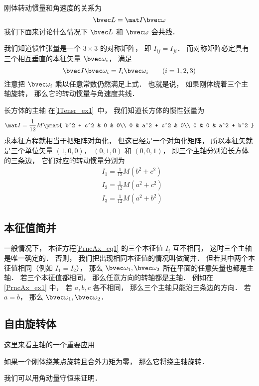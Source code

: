 
\begin{issues}
\issueDraft
\end{issues}


刚体转动惯量和角速度的关系为
\begin{equation}
\bvec L = \mat I \bvec \omega
\end{equation}
我们下面来讨论什么情况下 $\bvec L$ 和 $\bvec \omega$ 会共线．

我们知道惯性张量是一个 $3\times 3$ 的对称矩阵， 即 $I_{ij} = I_{ji}$． 而对称矩阵必定具有三个相互垂直的本征矢量 $\bvec \omega_i$， 满足
\begin{equation}\label{PrncAx_eq1}
\bvec I \bvec \omega_i = I_i \bvec \omega_i \qquad (i = 1,2,3)
\end{equation}
注意把 $\bvec \omega_i$ 乘以任意常数仍然满足上式． 也就是说， 如果刚体绕着三个主轴旋转， 那么它的转动惯量与角速度共线．

\begin{example}{长方体的主轴}\label{PrncAx_ex1}
在\autoref{ITensr_ex1}~中， 我们知道长方体的惯性张量为
\begin{equation}
\mat I = \frac{1}{12} M
\pmat{
   b^2 + c^2 & 0 & 0\\
   0 & a^2 + c^2 & 0\\
   0 & 0 & a^2 + b^2
}
\end{equation}
求本征方程就相当于把矩阵对角化， 但这已经是一个对角化矩阵， 所以本征矢就是三个单位矢量 $(1,0,0)$， $(0,1,0)$ 和 $(0,0,1)$， 即三个主轴分别沿长方体的三条边， 它们对应的转动惯量分别为
\begin{equation}
\begin{aligned}
&I_1 = \frac{1}{12}M(b^2+c^2)\\
&I_2 = \frac{1}{12}M(a^2+c^2)\\
&I_3 = \frac{1}{12}M(a^2+b^2)
\end{aligned}
\end{equation}
\end{example}

\subsection{本征值简并}
一般情况下， 本征方程\autoref{PrncAx_eq1} 的三个本征值 $I_i$ 互不相同， 这时三个主轴是唯一确定的． 否则， 我们把出现相同本征值的情况叫做简并． 但若其中两个本征值相同（例如 $I_1 = I_2$）， 那么 $\bvec \omega_1, \bvec \omega_2$ 所在平面的任意矢量也都是主轴． 若三个本征值都相同， 那么任意方向的转轴都是主轴． 例如在\autoref{PrncAx_ex1} 中， 若 $a,b,c$ 各不相同， 那么三个主轴只能沿三条边的方向． 若 $a = b$， 那么 $\bvec \omega_1, \bvec \omega_2$．

\subsection{自由旋转体}
这里来看主轴的一个重要应用
\begin{theorem}{}
如果一个刚体绕某点旋转且合外力矩为零， 那么它将绕主轴旋转．
\end{theorem}
我们可以用角动量守恒来证明．
